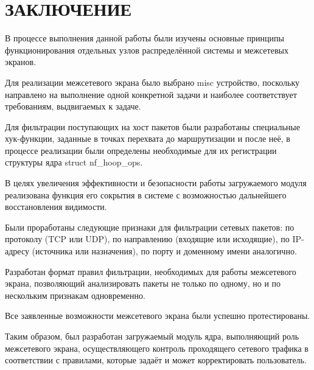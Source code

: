 \section*{ЗАКЛЮЧЕНИЕ}

В процессе выполнения данной работы были изучены основные принципы функционирования отдельных узлов распределённой системы и межсетевых экранов. 

Для реализации межсетевого экрана было выбрано misc устройство, поскольку направлено на выполнение одной конкретной задачи и наиболее соответствует требованиям, выдвигаемых к задаче. 

Для фильтрации поступающих на хост пакетов были разработаны специальные хук-функции, заданные в точках перехвата до маршрутизации и после неё, в процессе реализации были определены необходимые для их регистрации структуры ядра struct nf\_hoop\_ops. 

В целях увеличения эффективности и безопасности работы загружаемого модуля реализована функция его сокрытия в системе с возможностью дальнейшего восстановления видимости. 

Были проработаны следующие признаки для фильтрации сетевых пакетов: по протоколу (TCP или UDP), по направлению (входящие или исходящие), по IP-адресу (источника или назначения), по порту и доменному имени аналогично. 

Разработан формат правил фильтрации, необходимых для работы межсетевого экрана, позволяющий анализировать пакеты не только по одному, но и по нескольким признакам одновременно.

Все заявленные возможности межсетевого экрана были успешно протестированы.

Таким образом, был разработан загружаемый модуль ядра, выполняющий роль межсетевого экрана, осуществляющего контроль проходящего сетевого трафика в соответствии с правилами, которые задаёт и может корректировать пользователь. 

\pagebreak